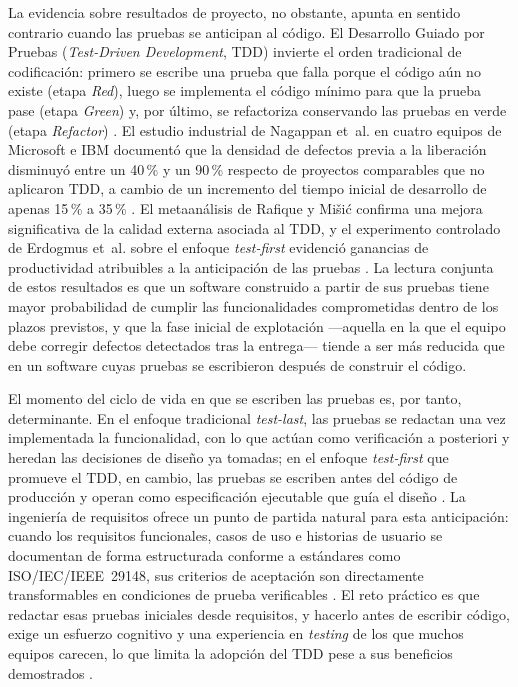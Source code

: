 \documentclass[10pt,journal,twoside,letterpaper]{IEEEtran}
\begin{document}
	La evidencia sobre resultados de proyecto, no obstante, apunta en sentido contrario cuando las pruebas se anticipan al código. El Desarrollo Guiado por Pruebas (\emph{Test-Driven Development}, TDD) invierte el orden tradicional de codificación: primero se escribe una prueba que falla porque el código aún no existe (etapa \emph{Red}), luego se implementa el código mínimo para que la prueba pase (etapa \emph{Green}) y, por último, se refactoriza conservando las pruebas en verde (etapa \emph{Refactor}) \cite{beck2003tdd}. El estudio industrial de Nagappan et~al. en cuatro equipos de Microsoft e IBM documentó que la densidad de defectos previa a la liberación disminuyó entre un 40\,\% y un 90\,\% respecto de proyectos comparables que no aplicaron TDD, a cambio de un incremento del tiempo inicial de desarrollo de apenas 15\,\% a 35\,\% \cite{nagappan2008tdd}. El metaanálisis de Rafique y Mišić confirma una mejora significativa de la calidad externa asociada al TDD, y el experimento controlado de Erdogmus et~al. sobre el enfoque \emph{test-first} evidenció ganancias de productividad atribuibles a la anticipación de las pruebas \cite{rafique2013meta,erdogmus2005testfirst}. La lectura conjunta de estos resultados es que un software construido a partir de sus pruebas tiene mayor probabilidad de cumplir las funcionalidades comprometidas dentro de los plazos previstos, y que la fase inicial de explotación ---aquella en la que el equipo debe corregir defectos detectados tras la entrega--- tiende a ser más reducida que en un software cuyas pruebas se escribieron después de construir el código.

	El momento del ciclo de vida en que se escriben las pruebas es, por tanto, determinante. En el enfoque tradicional \emph{test-last}, las pruebas se redactan una vez implementada la funcionalidad, con lo que actúan como verificación a posteriori y heredan las decisiones de diseño ya tomadas; en el enfoque \emph{test-first} que promueve el TDD, en cambio, las pruebas se escriben antes del código de producción y operan como especificación ejecutable que guía el diseño \cite{beck2003tdd,erdogmus2005testfirst}. La ingeniería de requisitos ofrece un punto de partida natural para esta anticipación: cuando los requisitos funcionales, casos de uso e historias de usuario se documentan de forma estructurada conforme a estándares como ISO/IEC/IEEE~29148, sus criterios de aceptación son directamente transformables en condiciones de prueba verificables \cite{iso29148}. El reto práctico es que redactar esas pruebas iniciales desde requisitos, y hacerlo antes de escribir código, exige un esfuerzo cognitivo y una experiencia en \emph{testing} de los que muchos equipos carecen, lo que limita la adopción del TDD pese a sus beneficios demostrados \cite{ghafari2020inconclusive}.
\end{document}
